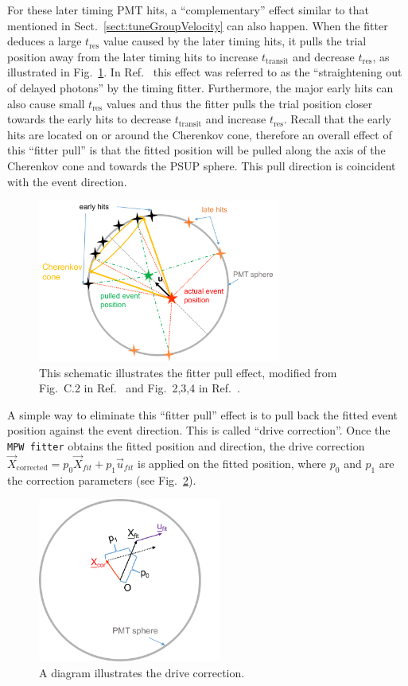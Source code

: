 For these later timing PMT hits, a ``complementary'' effect similar to that mentioned in Sect.~\ref{sect:tuneGroupVelocity} can also happen. When the fitter deduces a large $t_\mathrm{res}$ value caused by the later timing hits, it pulls the trial position away from the later timing hits to increase $t_\mathrm{transit}$ and decrease $t_\mathrm{res}$, as illustrated in Fig.~\ref{fitterPull}. In Ref.~\cite{driveCorPeter} this effect was referred to as the ``straightening out of delayed photons'' by the timing fitter. Furthermore, the major early hits can also cause small $t_\mathrm{res}$ values and thus the fitter pulls the trial position closer towards the early hits to decrease $t_\mathrm{transit}$ and increase $t_\mathrm{res}$. Recall that the early hits are located on or around the Cherenkov cone, therefore an overall effect of this ``fitter pull'' is that the fitted position will be pulled along the axis of the Cherenkov cone and towards the PSUP sphere. This pull direction is coincident with the event direction.

\begin{figure}[!htb]
	\centering
	\includegraphics[width=8cm]{fitterPull.png}
\caption[A cartoon shows fitter pull effect.]{This schematic illustrates the fitter pull effect, modified from Fig.~C.2 in Ref.~\cite{brice1996monte} and Fig.~2,3,4 in Ref.~\cite{driveCorPeter}.}
	\label{fitterPull}
\end{figure}

A simple way to eliminate this ``fitter pull'' effect is to pull back the fitted event position against the event direction. This is called ``drive correction''. Once the \texttt{MPW fitter} obtains the fitted position and direction, the drive correction $\vec{X}_{\mathrm{corrected}} = p_0\vec{X}_{fit}+p_1\vec{u}_{fit}$ is applied on the fitted position, where $p_0$ and $p_1$ are the correction parameters (see Fig.~\ref{drivecor}).
\begin{figure}[!htb]
	\centering
	\includegraphics[width=6cm]{driveCor.png}
	\caption{ A diagram illustrates the drive correction.}
	\label{drivecor}
\end{figure}

